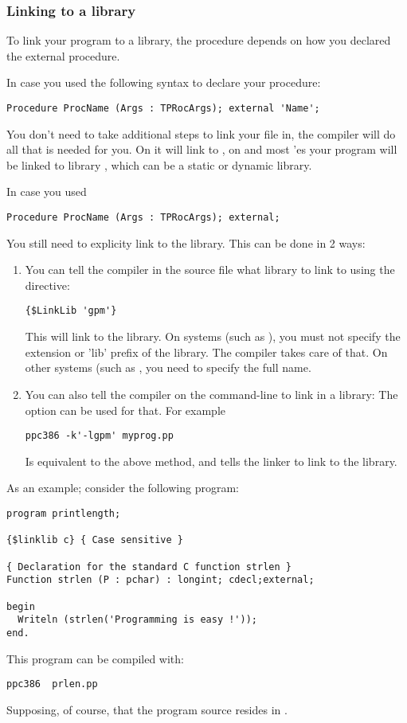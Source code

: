 \subsubsection{Linking to a library}
\label{se:LinkOut}

To link your program to a library, the procedure depends on how you declared
the external procedure.

In case you used the following syntax to declare your procedure:
\begin{verbatim}
Procedure ProcName (Args : TPRocArgs); external 'Name';
\end{verbatim}
You don't need to take additional steps to link your file in, the compiler
will do all that is needed for you. On \windows it will link to
, on \linux and most \unix'es your program will be linked to library
, which can be a static or dynamic library.

In case you used
\begin{verbatim}
Procedure ProcName (Args : TPRocArgs); external;
\end{verbatim}
You still need to explicity link to the library. This can be done in 2 ways:
\begin{enumerate}
\item You can tell the compiler in the source file what library to link to
using the  directive:
\begin{verbatim}
{$LinkLib 'gpm'}
\end{verbatim}
This will link to the  library. On \unix systems (such as \linux),
you must not specify the extension or 'lib' prefix of the library. The compiler takes
care of that. On other systems (such as \windows, you need to specify the full
name.
\item You can also tell the compiler on the command-line to link in a
library: The  option can be used for that. For example
\begin{verbatim}
ppc386 -k'-lgpm' myprog.pp
\end{verbatim}
Is equivalent to the above method, and tells the linker to link to the
 library.
\end{enumerate}

As an example; consider the following program:
\begin{verbatim}
program printlength;

{$linklib c} { Case sensitive }

{ Declaration for the standard C function strlen }
Function strlen (P : pchar) : longint; cdecl;external;

begin
  Writeln (strlen('Programming is easy !'));
end.
\end{verbatim}
This program can be compiled with:
\begin{verbatim}
ppc386  prlen.pp
\end{verbatim}
Supposing, of course, that the program source resides in .

